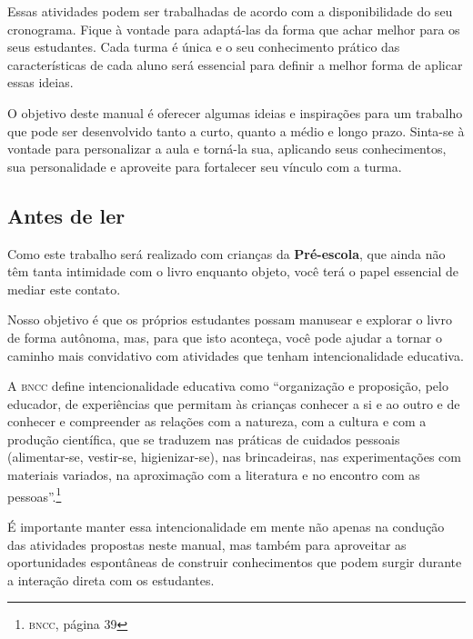 \documentclass[11pt]{extarticle}
\begin{document}
Essas atividades podem ser trabalhadas de acordo com a 
disponibilidade do seu cronograma. Fique à vontade para adaptá-las 
da forma que achar melhor para os seus estudantes. Cada turma é única 
e o seu conhecimento prático das características de cada aluno será 
essencial para definir a melhor forma de aplicar essas ideias. 

O objetivo deste manual é oferecer algumas ideias 
e inspirações para um trabalho que pode ser desenvolvido tanto 
a curto, quanto a médio e longo prazo. Sinta-se à vontade para 
personalizar a aula e torná-la sua, aplicando seus conhecimentos, sua 
personalidade e aproveite para fortalecer 
seu vínculo com a turma.


\subsection{Antes de ler}


Como este trabalho será realizado com crianças da \textbf{Pré-escola}, 
que ainda não têm tanta intimidade com o livro enquanto objeto, você terá o 
papel essencial de mediar este contato. 

Nosso objetivo é que os próprios estudantes possam manusear 
e explorar o livro de forma autônoma, mas, para que isto aconteça, você 
pode ajudar a tornar o caminho mais convidativo com atividades que tenham 
intencionalidade educativa. 

A \textsc{bncc} define intencionalidade educativa como ``organização 
e proposição, pelo educador, de experiências que permitam às crianças 
conhecer a si e ao outro e de conhecer e compreender as relações com a 
natureza, com a cultura e com a produção científica, que se traduzem nas 
práticas de cuidados pessoais (alimentar-se, vestir-se, higienizar-se), 
nas brincadeiras, nas experimentações com materiais 
variados, na aproximação com a literatura e no encontro com as 
pessoas''.\footnote{\textsc{bncc}, página 39}

É importante manter essa intencionalidade em mente não apenas na condução 
das atividades propostas neste manual, mas também para aproveitar as 
oportunidades espontâneas de construir conhecimentos que podem surgir durante 
a interação direta com os estudantes.
\end{document}
